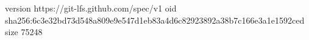 version https://git-lfs.github.com/spec/v1
oid sha256:6c3e32bd73d548a809e9e547d1eb83a4d6c82923892a38b7c166e3a1e1592ced
size 75248
